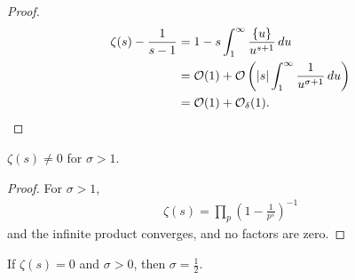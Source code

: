 \documentclass{article}
\newcommand{\1}{\mathbbm{1}}
\newcommand{\bigO}{\mathcal{O}}
\begin{document}
\begin{proof}
  \begin{align*}
    \zeta(s) - \frac{1}{s-1} &= 1 - s \int_1^\infty \frac{\{u\}}{u^{s+1}}\,du \\
                             &= \bigO(1) + \bigO\left(|s|\int_1^\infty \frac{1}{u^{\sigma+1}}\,du\right) \\
                             &= \bigO(1) + \bigO_\delta(1).\qedhere
  \end{align*}
\end{proof}
\begin{lemma}
  $\zeta(s) \neq 0$ for $\sigma > 1$.
\end{lemma}
\begin{proof}
  For $\sigma > 1$,
  \begin{align*}
    \zeta(s) = \prod_p \left(1 - \frac{1}{p^s}\right)^{-1}
  \end{align*}
  and the infinite product converges, and no factors are zero.
\end{proof}
\begin{conjecture}
  If $\zeta(s) = 0$ and $\sigma > 0$, then $\sigma = \frac{1}{2}$.
\end{conjecture}
\end{document}

